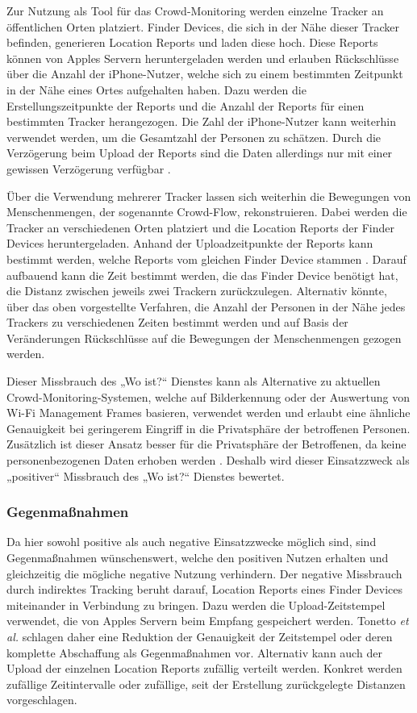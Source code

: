 Zur Nutzung als Tool für das Crowd-Monitoring werden einzelne Tracker an öffentlichen Orten platziert.
Finder Devices, die sich in der Nähe dieser Tracker befinden, generieren Location Reports und laden diese hoch.
Diese Reports können von Apples Servern heruntergeladen werden und erlauben Rückschlüsse über die Anzahl der iPhone-Nutzer, welche sich zu einem bestimmten Zeitpunkt in der Nähe eines Ortes aufgehalten haben.
Dazu werden die Erstellungszeitpunkte der Reports und die Anzahl der Reports für einen bestimmten Tracker herangezogen.
Die Zahl der iPhone-Nutzer kann weiterhin verwendet werden, um die Gesamtzahl der Personen zu schätzen.
Durch die Verzögerung beim Upload der Reports sind die Daten allerdings nur mit einer gewissen Verzögerung verfügbar \cite{Tonetto_FindMy}.

Über die Verwendung mehrerer Tracker lassen sich weiterhin die Bewegungen von Menschenmengen, der sogenannte Crowd-Flow, rekonstruieren.
Dabei werden die Tracker an verschiedenen Orten platziert und die Location Reports der Finder Devices heruntergeladen.
Anhand der Uploadzeitpunkte der Reports kann bestimmt werden, welche Reports vom gleichen Finder Device stammen \cite{Tonetto_FindMy}.
Darauf aufbauend kann die Zeit bestimmt werden, die das Finder Device benötigt hat, die Distanz zwischen jeweils zwei Trackern zurückzulegen.
Alternativ könnte, über das oben vorgestellte Verfahren, die Anzahl der Personen in der Nähe jedes Trackers zu verschiedenen Zeiten bestimmt werden und auf Basis der Veränderungen Rückschlüsse auf die Bewegungen der Menschenmengen gezogen werden.


Dieser Missbrauch des „Wo ist?“ Dienstes kann als Alternative zu aktuellen Crowd-Monitoring-Systemen, welche auf Bilderkennung oder der Auswertung von Wi-Fi Management Frames basieren, verwendet werden und erlaubt eine ähnliche Genauigkeit bei geringerem Eingriff in die Privatsphäre der betroffenen Personen.
Zusätzlich ist dieser Ansatz besser für die Privatsphäre der Betroffenen, da keine personenbezogenen Daten erhoben werden \cite{Tonetto_FindMy}.
Deshalb wird dieser Einsatzzweck als „positiver“ Missbrauch des „Wo ist?“ Dienstes bewertet.


\subsubsection{Gegenmaßnahmen}
Da hier sowohl positive als auch negative Einsatzzwecke möglich sind, sind Gegenmaßnahmen wünschenswert, welche den positiven Nutzen erhalten und gleichzeitig die mögliche negative Nutzung verhindern.
Der negative Missbrauch durch indirektes Tracking beruht darauf, Location Reports eines Finder Devices miteinander in Verbindung zu bringen.
Dazu werden die Upload-Zeitstempel verwendet, die von Apples Servern beim Empfang gespeichert werden.
Tonetto \textit{et al.} \cite{Tonetto_FindMy} schlagen daher eine Reduktion der Genauigkeit der Zeitstempel oder deren komplette Abschaffung als Gegenmaßnahmen vor.
Alternativ kann auch der Upload der einzelnen Location Reports zufällig verteilt werden.
Konkret werden zufällige Zeitintervalle oder zufällige, seit der Erstellung zurückgelegte Distanzen vorgeschlagen.


